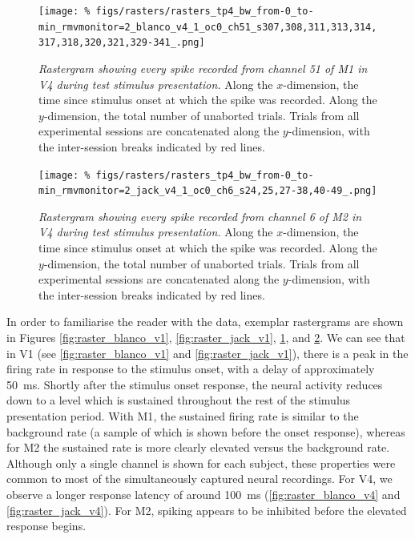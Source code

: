 \begin{figure}[p]
    \centering
    \texttt{[image: \%
figs/rasters/rasters\_tp4\_bw\_from-0\_to-min\_rmvmonitor=2\_blanco\_v4\_1\_oc0\_ch51\_s307,308,311,313,314,317,318,320,321,329-341\_.png]}
    \caption{\textit{Rastergram showing every spike recorded from channel \num{51} of \ac{M1} in \ac{V4} during test stimulus presentation.}
    Along the $x$-dimension, the time since stimulus onset at which the spike was recorded.
    Along the $y$-dimension, the total number of unaborted trials.
    Trials from all experimental sessions are concatenated along the $y$-dimension, with the inter-session breaks indicated by red lines.
}
    \label{fig:raster_blanco_v4}
\end{figure}


\begin{figure}[p]
    \centering
    \texttt{[image: \%
figs/rasters/rasters\_tp4\_bw\_from-0\_to-min\_rmvmonitor=2\_jack\_v4\_1\_oc0\_ch6\_s24,25,27-38,40-49\_.png]}
    \caption{\textit{Rastergram showing every spike recorded from channel \num{6} of \ac{M2} in \ac{V4} during test stimulus presentation.}
    Along the $x$-dimension, the time since stimulus onset at which the spike was recorded.
    Along the $y$-dimension, the total number of unaborted trials.
    Trials from all experimental sessions are concatenated along the $y$-dimension, with the inter-session breaks indicated by red lines.
}
    \label{fig:raster_jack_v4}
\end{figure}


In order to familiarise the reader with the data, exemplar rastergrams are shown in Figures \ref{fig:raster_blanco_v1}, \ref{fig:raster_jack_v1}, \ref{fig:raster_blanco_v4}, and \ref{fig:raster_jack_v4}.
We can see that in \ac{V1} (see \autoref{fig:raster_blanco_v1} and \autoref{fig:raster_jack_v1}), there is a peak in the firing rate in response to the stimulus onset, with a delay of approximately \SI{50}{\milli\second}.
Shortly after the stimulus onset response, the neural activity reduces down to a level which is sustained throughout the rest of the stimulus presentation period.
With \ac{M1}, the sustained firing rate is similar to the background rate (a sample of which is shown before the onset response), whereas for \ac{M2} the sustained rate is more clearly elevated versus the background rate.
Although only a single channel is shown for each subject, these properties were common to most of the simultaneously captured neural recordings.
For \ac{V4}, we observe a longer response latency of around \SI{100}{\milli\second} (\autoref{fig:raster_blanco_v4} and \autoref{fig:raster_jack_v4}).
For \ac{M2}, spiking appears to be inhibited before the elevated response begins.

